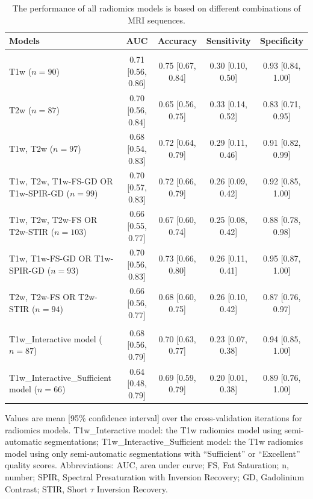 \begin{table}[htbp]
	\caption{The performance of all radiomics models is based on different combinations of MRI sequences.}
	\label{tab:ch2_models}
	\footnotesize
	\setlength{\tabcolsep}{4pt}
	\begin{tabular}{@{}>{\raggedright\arraybackslash}p{3.3cm}cccc@{}}
		\toprule
		\textbf{Models} & \textbf{AUC} & \textbf{Accuracy} & \textbf{Sensitivity} & \textbf{Specificity} \\
		\midrule
		\multicolumn{5}{@{}l}{\textit{\textbf{Models with manual segmentations}}} \\
		T1w ($n = 90$) & 0.71 [0.56, 0.86] & 0.75 [0.67, 0.84] & 0.30 [0.10, 0.50] & 0.93 [0.84, 1.00] \\
		T2w ($n = 87$) & 0.70 [0.56, 0.84] & 0.65 [0.56, 0.75] & 0.33 [0.14, 0.52] & 0.83 [0.71, 0.95] \\
		T1w, T2w ($n = 97$) & 0.68 [0.54, 0.83] & 0.72 [0.64, 0.79] & 0.29 [0.11, 0.46] & 0.91 [0.82, 0.99] \\
		T1w, T2w, T1w-FS-GD OR T1w-SPIR-GD ($n = 99$) & 0.70 [0.57, 0.83] & 0.72 [0.66, 0.79] & 0.26 [0.09, 0.42] & 0.92 [0.85, 1.00] \\
		T1w, T2w, T2w-FS OR T2w-STIR ($n = 103$) & 0.66 [0.55, 0.77] & 0.67 [0.60, 0.74] & 0.25 [0.08, 0.42] & 0.88 [0.78, 0.98] \\
		T1w, T1w-FS-GD OR T1w-SPIR-GD ($n = 93$) & 0.70 [0.56, 0.83] & 0.73 [0.66, 0.80] & 0.26 [0.11, 0.41] & 0.95 [0.87, 1.00] \\
		T2w, T2w-FS OR T2w-STIR ($n = 94$) & 0.66 [0.56, 0.77] & 0.68 [0.60, 0.75] & 0.26 [0.10, 0.42] & 0.87 [0.76, 0.97] \\
		\midrule
		\multicolumn{5}{@{}l}{\textit{\textbf{Models with semi-automatic segmentations using InteractiveNet}}} \\
		T1w\_Interactive model ($n = 87$) & 0.68 [0.56, 0.79] & 0.70 [0.63, 0.77] & 0.23 [0.07, 0.38] & 0.94 [0.85, 1.00] \\
		T1w\_Interactive\_Sufficient model ($n = 66$) & 0.64 [0.48, 0.79] & 0.69 [0.59, 0.79] & 0.20 [0.01, 0.38] & 0.89 [0.76, 1.00] \\
		\bottomrule
	\end{tabular}

	\vspace{2mm}
	\parbox{\textwidth}{\footnotesize Values are mean [95\% confidence interval] over the cross-validation iterations for radiomics models. T1w\_Interactive model: the T1w radiomics model using semi-automatic segmentations; T1w\_Interactive\_Sufficient model: the T1w radiomics model using only semi-automatic segmentations with ``Sufficient'' or ``Excellent'' quality scores. Abbreviations: AUC, area under curve; FS, Fat Saturation; n, number; SPIR, Spectral Presaturation with Inversion Recovery; GD, Gadolinium Contrast; STIR, Short $\tau$ Inversion Recovery.}
\end{table}

